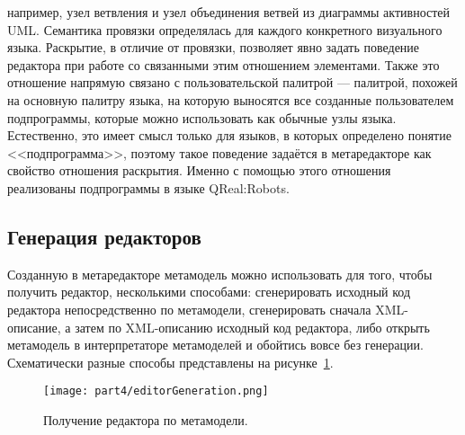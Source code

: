 \begin{enumerate}
		например, узел ветвления и узел объединения ветвей из диаграммы активностей UML. 
		Семантика провязки определялась для каждого конкретного визуального языка. Раскрытие, 
		в отличие от провязки, позволяет явно задать поведение редактора при работе со 
		связанными этим отношением элементами. Также это отношение напрямую связано с 
		пользовательской палитрой --- палитрой, похожей на основную палитру языка, на 
		которую выносятся все созданные пользователем подпрограммы, которые можно использовать 
		как обычные узлы языка. Естественно, это имеет смысл только для языков, в которых 
		определено понятие <<подпрограмма>>, поэтому такое поведение задаётся в метаредакторе 
		как свойство отношения раскрытия. Именно с помощью этого отношения реализованы 
		подпрограммы в языке QReal:Robots.
\end{enumerate}

\subsection{Генерация редакторов}
Созданную в метаредакторе метамодель можно использовать для того, чтобы получить редактор, 
несколькими способами: сгенерировать исходный код редактора непосредственно по метамодели, 
сгенерировать сначала XML-описание, а затем по XML-описанию исходный код редактора, 
либо открыть метамодель в интерпретаторе метамоделей и обойтись вовсе без генерации. 
Схематически разные способы представлены на рисунке~\ref{image:editorGeneration}.

\begin{figure} [ht]
	\begin{center}
		\texttt{[image: part4/editorGeneration.png]}
		\caption{Получение редактора по метамодели.}
		\label{image:editorGeneration}
	\end{center}
\end{figure}

